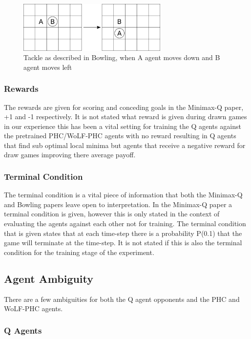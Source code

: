 \documentclass{article}
\begin{document}
\begin{figure}
    \centering
    \includegraphics[width=20em]{./Figures/bowling-tackle.png}
    \caption{Tackle as described in Bowling, when A agent moves down and B agent moves left}
    \label{fig:bowling-tackle}
\end{figure}

\subsubsection*{Rewards}

The rewards are given for scoring and conceding goals in the Minimax-Q paper, +1 and -1 respectively. It is not stated what reward is given during drawn games in our experience this has been a vital setting for training the Q agents against the pretrained PHC/WoLF-PHC agents with no reward resulting in Q agents that find sub optimal local minima but agents that receive a negative reward for draw games improving there average payoff.

\subsubsection*{Terminal Condition}
The terminal condition is a vital piece of information that both the Minimax-Q and Bowling papers leave open to interpretation. In the Minimax-Q paper a terminal condition is given, however this is only stated in the context of evaluating the agents against each other not for training. The terminal condition that is given states that at each time-step there is a probability P(0.1) that the game will terminate at the time-step. It is not stated if this is also the terminal condition for the training stage of the experiment.

\subsection*{Agent Ambiguity}

There are a few ambiguities for both the Q agent opponents and the PHC and WoLF-PHC agents. 

\subsubsection*{Q Agents}
\end{document}
